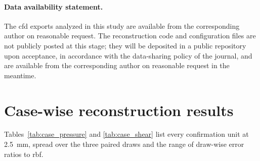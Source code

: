 \documentclass[12pt,a4paper]{article}
\newcommand{\CFD}{\ac{cfd}\xspace}
\newcommand{\RBF}{\ac{rbf}\xspace}
\theoremstyle{definition}
\numberwithin{equation}{section}
\begin{document}




\paragraph{Data availability statement.} The \CFD exports analyzed in this study are available from the corresponding author on reasonable request. The reconstruction code and configuration files are not publicly posted at this stage; they will be deposited in a public repository upon acceptance, in accordance with the data-sharing policy of the journal, and are available from the corresponding author on reasonable request in the meantime.
\appendix
\section{Case-wise reconstruction results}
\label{app:casewise}
Tables~\ref{tab:case_pressure} and \ref{tab:case_shear} list every confirmation unit at 2.5~mm, spread over the three paired draws and the range of draw-wise error ratios to \RBF.




\newpage


\end{document}

